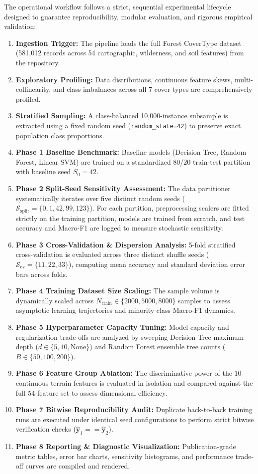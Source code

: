 The operational workflow follows a strict, sequential experimental lifecycle designed to guarantee reproducibility, modular evaluation, and rigorous empirical validation:
\begin{enumerate}
    \item \textbf{Ingestion Trigger:} The pipeline loads the full Forest CoverType dataset (581,012 records across 54 cartographic, wilderness, and soil features) from the repository.
    \item \textbf{Exploratory Profiling:} Data distributions, continuous feature skews, multi-collinearity, and class imbalances across all 7 cover types are comprehensively profiled.
    \item \textbf{Stratified Sampling:} A class-balanced 10,000-instance subsample is extracted using a fixed random seed (\texttt{random\_state=42}) to preserve exact population class proportions.
    \item \textbf{Phase 1 Baseline Benchmark:} Baseline models (Decision Tree, Random Forest, Linear SVM) are trained on a standardized 80/20 train-test partition with baseline seed $S_0=42$.
    \item \textbf{Phase 2 Split-Seed Sensitivity Assessment:} The data partitioner systematically iterates over five distinct random seeds ($\mathcal{S}_{\text{split}} = \{0, 1, 42, 99, 123\}$). For each partition, preprocessing scalers are fitted strictly on the training partition, models are trained from scratch, and test accuracy and Macro-F1 are logged to measure stochastic sensitivity.
    \item \textbf{Phase 3 Cross-Validation \& Dispersion Analysis:} 5-fold stratified cross-validation is evaluated across three distinct shuffle seeds ($\mathcal{S}_{\text{cv}} = \{11, 22, 33\}$), computing mean accuracy and standard deviation error bars across folds.
    \item \textbf{Phase 4 Training Dataset Size Scaling:} The sample volume is dynamically scaled across $N_{\text{train}} \in \{2000, 5000, 8000\}$ samples to assess asymptotic learning trajectories and minority class Macro-F1 dynamics.
    \item \textbf{Phase 5 Hyperparameter Capacity Tuning:} Model capacity and regularization trade-offs are analyzed by sweeping Decision Tree maximum depth ($d \in \{5, 10, \text{None}\}$) and Random Forest ensemble tree counts ($B \in \{50, 100, 200\}$).
    \item \textbf{Phase 6 Feature Group Ablation:} The discriminative power of the 10 continuous terrain features is evaluated in isolation and compared against the full 54-feature set to assess dimensional efficiency.
    \item \textbf{Phase 7 Bitwise Reproducibility Audit:} Duplicate back-to-back training runs are executed under identical seed configurations to perform strict bitwise verification checks ($\hat{\mathbf{y}}_1 == \hat{\mathbf{y}}_2$).
    \item \textbf{Phase 8 Reporting \& Diagnostic Visualization:} Publication-grade metric tables, error bar charts, sensitivity histograms, and performance trade-off curves are compiled and rendered.
\end{enumerate}

